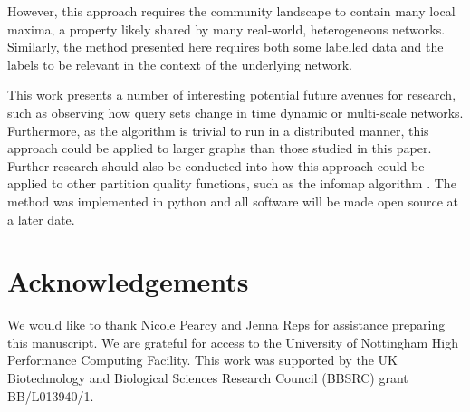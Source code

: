 \documentclass[sigconf]{acmart}
\begin{document}
However, this approach requires the community landscape to contain many local maxima, a property likely shared by many real-world, heterogeneous networks.
Similarly, the method presented here requires both some labelled data and the labels to be relevant in the context of the underlying network.

This work presents a number of interesting potential future avenues for research, such as observing how query sets change in time dynamic or multi-scale networks.
Furthermore, as the algorithm is trivial to run in a distributed manner, this approach could be applied to larger graphs than those studied in this paper.
Further research should also be conducted into how this approach could be applied to other partition quality functions, such as the infomap algorithm \cite{Rosvall:2008fi}.
The method was implemented in python and all software will be made open source at a later date.

\section*{Acknowledgements}
We would like to thank Nicole Pearcy and Jenna Reps for assistance preparing this manuscript.
We are grateful for access to the University of Nottingham High Performance Computing Facility.
This work was supported by the UK Biotechnology and Biological Sciences Research Council (BBSRC) grant BB/L013940/1.

 

\end{document}
